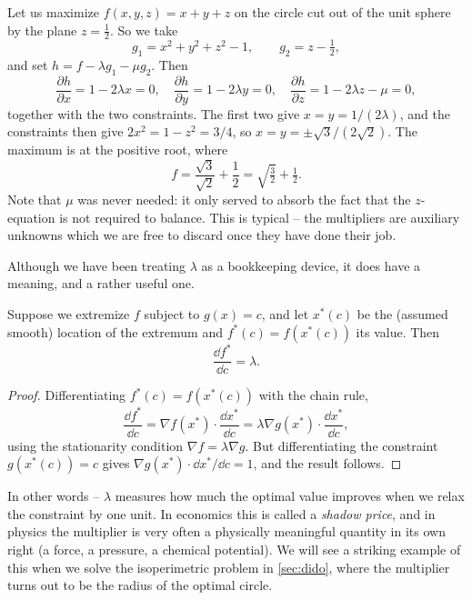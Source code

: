 \begin{example}
	Let us maximize $f(x, y, z) = x + y + z$ on the circle cut out of the unit sphere by the plane $z = \frac{1}{2}$. So we take
	$$
	g_1 = x^2 + y^2 + z^2 - 1, \qquad g_2 = z - \tfrac{1}{2},
	$$
	and set $h = f - \lambda g_1 - \mu g_2$. Then
	$$
	\frac{\partial h}{\partial x} = 1 - 2\lambda x = 0, \quad \frac{\partial h}{\partial y} = 1 - 2 \lambda y = 0, \quad \frac{\partial h}{\partial z} = 1 - 2 \lambda z - \mu = 0,
	$$
	together with the two constraints. The first two give $x = y = 1/(2\lambda)$, and the constraints then give $2x^2 = 1 - z^2 = 3/4$, so $x = y = \pm\sqrt{3}/(2\sqrt{2})$. The maximum is at the positive root, where
	$$
	f = \frac{\sqrt{3}}{\sqrt{2}} + \frac{1}{2} = \sqrt{\tfrac{3}{2}} + \tfrac{1}{2}.
	$$
	Note that $\mu$ was never needed: it only served to absorb the fact that the $z$-equation is not required to balance. This is typical -- the multipliers are auxiliary unknowns which we are free to discard once they have done their job.
\end{example}

Although we have been treating $\lambda$ as a bookkeeping device, it does have a meaning, and a rather useful one.

\begin{proposition}
	Suppose we extremize $f$ subject to $g(x) = c$, and let $x^*(c)$ be the (assumed smooth) location of the extremum and $f^*(c) = f(x^*(c))$ its value. Then
	$$
	\frac{\dd f^*}{\dd c} = \lambda.
	$$
\end{proposition}
\begin{proof}
	Differentiating $f^*(c) = f(x^*(c))$ with the chain rule,
	$$
	\frac{\dd f^*}{\dd c} = \nabla f(x^*) \cdot \frac{\dd x^*}{\dd c} = \lambda \nabla g(x^*) \cdot \frac{\dd x^*}{\dd c},
	$$
	using the stationarity condition $\nabla f = \lambda \nabla g$. But differentiating the constraint $g(x^*(c)) = c$ gives $\nabla g(x^*) \cdot \dd x^*/\dd c = 1$, and the result follows.
\end{proof}

In other words -- $\lambda$ measures how much the optimal value improves when we relax the constraint by one unit. In economics this is called a \emph{shadow price}, and in physics the multiplier is very often a physically meaningful quantity in its own right (a force, a pressure, a chemical potential). We will see a striking example of this when we solve the isoperimetric problem in \autoref{sec:dido}, where the multiplier turns out to be the radius of the optimal circle.

